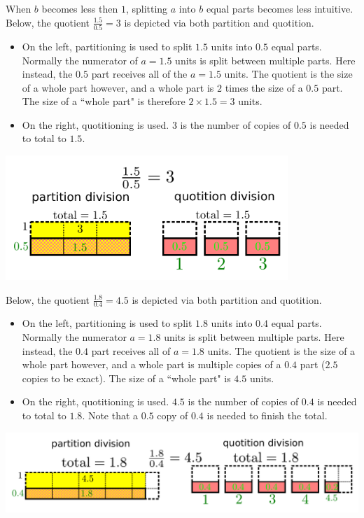 \documentclass{article}
\begin{document}
When \(b\) becomes less then \(1\), splitting \(a\) into \(b\) equal parts becomes less intuitive. Below, the quotient \(\frac{1.5}{0.5} = 3\) is depicted via both partition and quotition. 
\begin{itemize}
\item On the left, partitioning is used to split \(1.5\) units into \(0.5\) equal parts. Normally the numerator of \(a = 1.5\) units is split between multiple parts. Here instead, the \(0.5\) part receives all of the \(a = 1.5\) units. The quotient is the size of a whole part however, and a whole part is \(2\) times the size of a \(0.5\) part. The size of a ``whole part" is therefore \(2 \times 1.5 = 3\) units. 
\item On the right, quotitioning is used. \(3\) is the number of copies of \(0.5\) is needed to total to \(1.5\).  
\end{itemize}
\includegraphics[width = 0.8\textwidth]{1p5_div_0p5}

\vspace{5mm}


Below, the quotient \(\frac{1.8}{0.4} = 4.5\) is depicted via both partition and quotition. 
\begin{itemize}
\item On the left, partitioning is used to split \(1.8\) units into \(0.4\) equal parts. Normally the numerator \(a = 1.8\) units is split between multiple parts. Here instead, the \(0.4\) part receives all of \(a = 1.8\) units. The quotient is the size of a whole part however, and a whole part is multiple copies of a \(0.4\) part (\(2.5\) copies to be exact). The size of a ``whole part" is \(4.5\) units. 
\item On the right, quotitioning is used. \(4.5\) is the number of copies of \(0.4\) is needed to total to \(1.8\). Note that a \(0.5\) copy of \(0.4\) is needed to finish the total.  
\end{itemize}
\includegraphics[width = \textwidth]{1p8_div_0p4}
\end{document}
